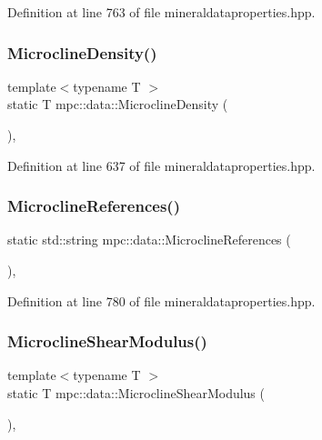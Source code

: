 Definition at line 763 of file mineraldataproperties.\+hpp.

\mbox{\label{namespacempc_1_1data_a0cb009cb9eeae02f75253cf33a717456}} 
\subsubsection{\texorpdfstring{Microcline\+Density()}{MicroclineDensity()}}
{\footnotesize\ttfamily template$<$typename T $>$ \\
static T mpc\+::data\+::\+Microcline\+Density (\begin{DoxyParamCaption}{ }\end{DoxyParamCaption})\hspace{0.3cm}{\ttfamily [inline]}, {\ttfamily [static]}}



Definition at line 637 of file mineraldataproperties.\+hpp.

\mbox{\label{namespacempc_1_1data_a0ab9d86c799823bd41134c22ad89ba84}} 
\subsubsection{\texorpdfstring{Microcline\+References()}{MicroclineReferences()}}
{\footnotesize\ttfamily static std\+::string mpc\+::data\+::\+Microcline\+References (\begin{DoxyParamCaption}{ }\end{DoxyParamCaption})\hspace{0.3cm}{\ttfamily [inline]}, {\ttfamily [static]}}



Definition at line 780 of file mineraldataproperties.\+hpp.

\mbox{\label{namespacempc_1_1data_a04b72339e0f03a2342bc8c6efca3df99}} 
\subsubsection{\texorpdfstring{Microcline\+Shear\+Modulus()}{MicroclineShearModulus()}}
{\footnotesize\ttfamily template$<$typename T $>$ \\
static T mpc\+::data\+::\+Microcline\+Shear\+Modulus (\begin{DoxyParamCaption}{ }\end{DoxyParamCaption})\hspace{0.3cm}{\ttfamily [inline]}, {\ttfamily [static]}}



